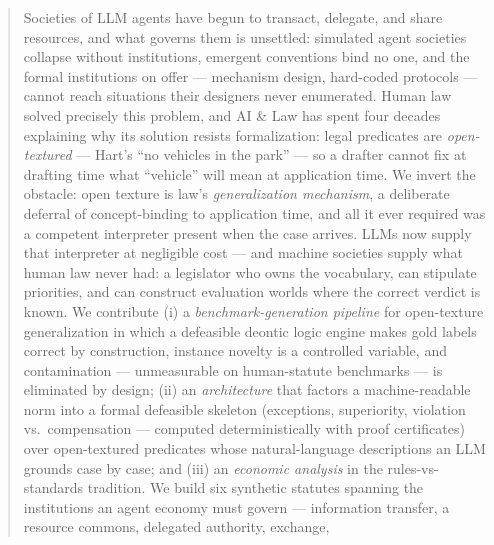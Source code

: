 \newcommand{\ANG}[1]{
  {\color{orange} ANG: #1
  }}
\newcommand{\elm}[1]{\textcolor{red}{[EMA: #1]}}
\newcommand{\cmt}[1]{\textcolor{blue}{[CHAR: #1]}}

\newcommand{\SAM}[1]{
  {\color{green} SAM: #1
}}

\newcommand{\EMA}[1]{
  {\color{red} EMA: #1
}}



\begin{abstract}
Societies of LLM agents have begun to transact, delegate, and share
resources, and what governs them is unsettled: simulated agent societies
collapse without institutions, emergent conventions bind no one, and the
formal institutions on offer --- mechanism design, hard-coded protocols ---
cannot reach situations their designers never enumerated. Human law solved
precisely this problem, and AI \& Law has spent four decades explaining why
its solution resists formalization: legal predicates are \emph{open-textured}
--- Hart's ``no vehicles in the park'' --- so a drafter cannot fix at
drafting time what ``vehicle'' will mean at application time. We invert the
obstacle: open texture is law's \emph{generalization mechanism}, a deliberate
deferral of concept-binding to application time, and all it ever required was
a competent interpreter present when the case arrives. LLMs now supply that
interpreter at negligible cost --- and machine societies supply what human
law never had: a legislator who owns the vocabulary, can stipulate
priorities, and can construct evaluation worlds where the correct verdict is
known. We contribute (i) a \emph{benchmark-generation pipeline} for
open-texture generalization in which a defeasible deontic logic engine makes
gold labels correct by construction, instance novelty is a controlled
variable, and contamination --- unmeasurable on human-statute benchmarks ---
is eliminated by design; (ii) an \emph{architecture} that factors a
machine-readable norm into a formal defeasible skeleton (exceptions,
superiority, violation vs.\ compensation --- computed deterministically with
proof certificates) over open-textured predicates whose natural-language
descriptions an LLM grounds case by case; and (iii) an \emph{economic
analysis} in the rules-vs-standards tradition. We build six synthetic
statutes spanning the institutions an agent economy must govern ---
information transfer, a resource commons, delegated authority, exchange,

\end{abstract}
